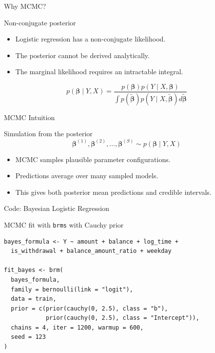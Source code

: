 \documentclass[aspectratio=169,11pt]{beamer}
\begin{document}
\begin{frame}{Why MCMC?}
  \begin{block}{Non-conjugate posterior}
  \begin{itemize}
    \item Logistic regression has a non-conjugate likelihood.
    \item The posterior cannot be derived analytically.
    \item The marginal likelihood requires an intractable integral.
  \end{itemize}
  \end{block}

  \[
  p(\bm{\beta}\mid Y,X)
  =
  \frac{p(\bm{\beta})p(Y\mid X,\bm{\beta})}
  {\int p(\bm{\tilde{\beta}})p(Y\mid X,\bm{\tilde{\beta}})d\bm{\tilde{\beta}}}
  \]
\end{frame}

\begin{frame}{MCMC Intuition}
  \begin{block}{Simulation from the posterior}
  \[
  \bm{\beta}^{(1)},\bm{\beta}^{(2)},\ldots,\bm{\beta}^{(S)}
  \sim
  p(\bm{\beta}\mid Y,X)
  \]
  \end{block}

  \begin{itemize}
    \item MCMC samples plausible parameter configurations.
    \item Predictions average over many sampled models.
    \item This gives both posterior mean predictions and credible intervals.
  \end{itemize}
\end{frame}

\begin{frame}[fragile]{Code: Bayesian Logistic Regression}
\begin{block}{MCMC fit with \texttt{brms} with Cauchy prior}
\begin{lstlisting}[style=rcode]
bayes_formula <- Y ~ amount + balance + log_time +
  is_withdrawal + balance_amount_ratio + weekday

fit_bayes <- brm(
  bayes_formula,
  family = bernoulli(link = "logit"),
  data = train,
  prior = c(prior(cauchy(0, 2.5), class = "b"),
            prior(cauchy(0, 2.5), class = "Intercept")),
  chains = 4, iter = 1200, warmup = 600,
  seed = 123
)
\end{lstlisting}
\end{block}
\end{frame}
\end{document}
